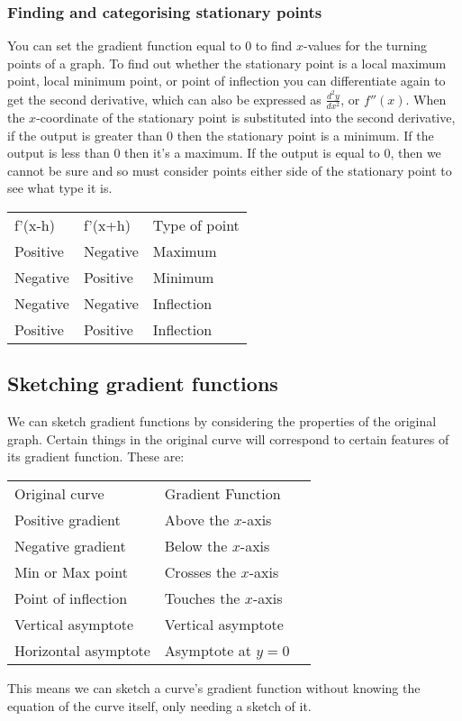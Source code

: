 \subsubsection{Finding and categorising stationary points}
You can set the gradient function equal to 0 to find $x$-values for the turning points of a graph. To find out whether the stationary point is a local maximum point, local minimum point, or point of inflection you can differentiate again to get the second derivative, which can also be expressed as $\frac{d^2y}{dx^2}$, or $f''(x)$. When the $x$-coordinate of the stationary point is substituted into the second derivative, if the output is greater than 0 then the stationary point is a minimum. If the output is less than 0 then it's a maximum. If the output is equal to 0, then we cannot be sure and so must consider points either side of the stationary point to see what type it is.
\begin{table}[ht]
	\center
\begin{tabular}{lll}
f'(x-h)  & f'(x+h)  & Type of point \\
Positive & Negative & Maximum       \\
Negative & Positive & Minimum       \\
Negative & Negative & Inflection    \\
Positive & Positive & Inflection
\end{tabular}
\end{table}

\subsection{Sketching gradient functions}
We can sketch gradient functions by considering the properties of the original graph. Certain things in the original curve will correspond to certain features of its gradient function. These are:
\begin{table}[h]
	\center
\begin{tabular}{lll}
Original curve       & Gradient Function    \\
Positive gradient    & Above the $x$-axis   \\
Negative gradient    & Below the $x$-axis   \\
Min or Max point     & Crosses the $x$-axis \\
Point of inflection  & Touches the $x$-axis \\
Vertical asymptote   & Vertical asymptote   \\
Horizontal asymptote & Asymptote at $y=0$   \\
\end{tabular}
\end{table}
This means we can sketch a curve's gradient function without knowing the equation of the curve itself, only needing a sketch of it.

